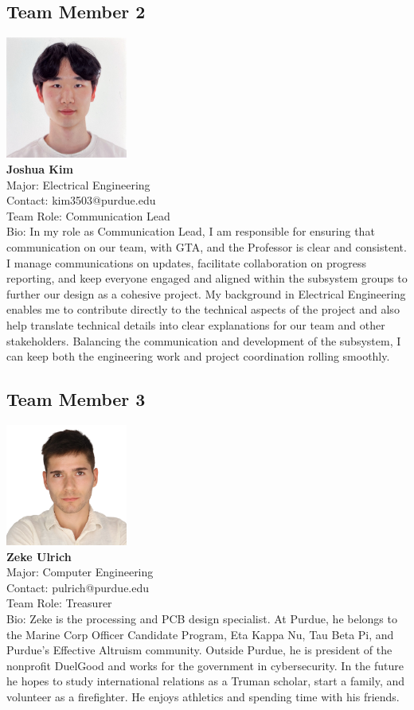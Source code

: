 \subsection{Team Member 2}
\includegraphics[height=4cm]{images/joshua.png} \\
\textbf{Joshua Kim}\\
Major: Electrical Engineering\\
Contact: kim3503@purdue.edu\\
Team Role: Communication Lead \\
Bio: In my role as Communication Lead,
I am responsible for ensuring that communication on our
team, with GTA, and the Professor is clear and consistent.
I manage communications on updates, facilitate collaboration on
progress reporting, and keep everyone engaged and aligned within
the subsystem groups to further our design as a cohesive project.
My background in Electrical Engineering enables me to contribute
directly to the technical aspects of the project and also help
translate technical details into clear explanations for our team
and other stakeholders. Balancing the communication and development
of the subsystem, I can keep both the engineering work and project
coordination rolling smoothly.

\subsection{Team Member 3}
\includegraphics[height=4cm]{images/zeke.png} \\
\textbf{Zeke Ulrich}\\
Major: Computer Engineering\\
Contact: pulrich@purdue.edu\\
Team Role: Treasurer \\
Bio: Zeke is the processing and PCB design specialist.
At Purdue, he belongs to the Marine Corp Officer Candidate Program,
Eta Kappa Nu, Tau Beta Pi, and Purdue's Effective Altruism community.
Outside Purdue, he is president of the nonprofit DuelGood and works
for the government in cybersecurity.
In the future he hopes to study international relations as a Truman
scholar, start a family, and volunteer as a firefighter.
He enjoys athletics and spending time with his friends.


